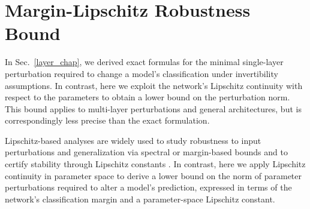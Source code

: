 \documentclass{article}
\theoremstyle{plain}
\theoremstyle{definition}
\theoremstyle{remark}
\begin{document}

 

\section{Margin-Lipschitz Robustness Bound}\label{margin_chap}
In Sec.~\ref{layer_chap}, we derived exact formulas for the minimal single-layer perturbation required to change a model’s classification under invertibility assumptions.
In contrast, here we exploit the network’s Lipschitz continuity with respect to the parameters to obtain a lower bound on the perturbation norm. This bound applies to multi-layer perturbations and general architectures, but is correspondingly less precise than the exact formulation.

Lipschitz-based analyses are widely used to study robustness to input perturbations and generalization via spectral or margin-based bounds \cite{bartlett_spectrally-normalized_2017} and to certify stability through Lipschitz constants \cite{fazlyab_efficient_2023, pauli_training_2022}. In contrast, here we apply Lipschitz continuity in parameter space to derive a lower bound on the norm of parameter perturbations required to alter a model’s prediction, expressed in terms of the network's classification margin and a parameter-space Lipschitz constant. 
\end{document}
